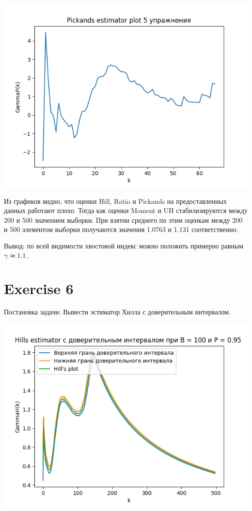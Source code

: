 \documentclass[reprint, amsmath, amssymb, aps,]{revtex4-2}
\begin{document}
\begin{center}
\centering 
\includegraphics[scale=0.6]{Exercise55.png}
\end{center}

Из графиков видно, что оценки Hill, Ratio и Pickands на предоставленных данных работают плохо. Тогда как оценки Moment и UH стабилизируются между 200 и 500 значением выборки. При взятии среднего по этим оценкам между 200 и 500 элементом выборки получаются значения 1.0763 и 1.131 соответственно.

Вывод: по всей видимости хвостовой индекс можно положить примерно равным $\gamma \thickapprox 1.1$.    

\section{Exercise 6}
Постановка задачи:
Вывести эстиматор Хилла с доверительным интервалом.

\begin{center}
\centering 
\includegraphics[scale=0.6]{Exercise6.png}
\end{center}
\end{document}
